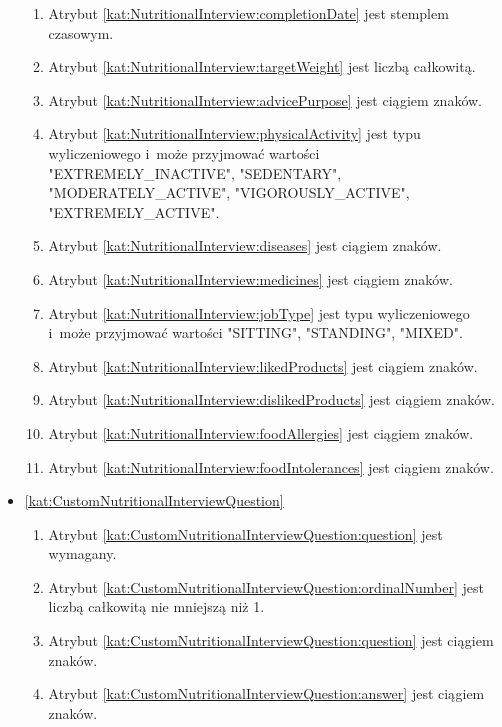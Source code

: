 \begin{itemize}[label={\textbf{Ograniczenia dla}}, wide, labelwidth=!, labelindent=0pt]
\begin{enumerate}[label={\textbf{OGR/5/\protect\twodigits{\arabic{enumi}}}}, wide, labelwidth=!, align=left, leftmargin=3cm, resume]
        \item Atrybut \ref{kat:NutritionalInterview:completionDate} jest stemplem czasowym.
        \item Atrybut \ref{kat:NutritionalInterview:targetWeight} jest liczbą całkowitą.
        \item Atrybut \ref{kat:NutritionalInterview:advicePurpose} jest ciągiem znaków.
        \item Atrybut \ref{kat:NutritionalInterview:physicalActivity} jest typu wyliczeniowego i~może przyjmować wartości "EXTREMELY\_INACTIVE", "SEDENTARY", "MODERATELY\_ACTIVE", "VIGOROUSLY\_ACTIVE", "EXTREMELY\_ACTIVE".
        \item Atrybut \ref{kat:NutritionalInterview:diseases} jest ciągiem znaków.
        \item Atrybut \ref{kat:NutritionalInterview:medicines} jest ciągiem znaków.
        \item Atrybut \ref{kat:NutritionalInterview:jobType} jest typu wyliczeniowego i~może przyjmować wartości "SITTING", "STANDING", "MIXED".
        \item Atrybut \ref{kat:NutritionalInterview:likedProducts} jest ciągiem znaków.
        \item Atrybut \ref{kat:NutritionalInterview:dislikedProducts} jest ciągiem znaków.
        \item Atrybut \ref{kat:NutritionalInterview:foodAllergies} jest ciągiem znaków.
        \item Atrybut \ref{kat:NutritionalInterview:foodIntolerances} jest ciągiem znaków.
    \end{enumerate}

    \item\ref{kat:CustomNutritionalInterviewQuestion}\mynobreakpar
    \begin{enumerate}[label={\textbf{OGR/5/\protect\twodigits{\arabic{enumi}}}}, wide, labelwidth=!, align=left, leftmargin=3cm, resume]
        \item Atrybut \ref{kat:CustomNutritionalInterviewQuestion:question} jest wymagany.

        \item Atrybut \ref{kat:CustomNutritionalInterviewQuestion:ordinalNumber} jest liczbą całkowitą nie mniejszą niż 1.
        \item Atrybut \ref{kat:CustomNutritionalInterviewQuestion:question} jest ciągiem znaków.
        \item Atrybut \ref{kat:CustomNutritionalInterviewQuestion:answer} jest ciągiem znaków.
    \end{enumerate}


\end{itemize}
